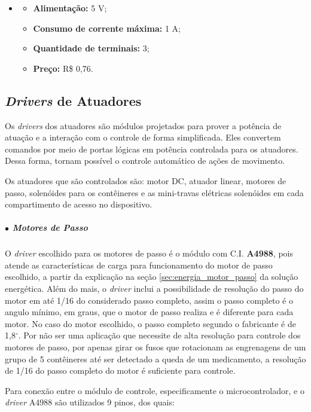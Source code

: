 	\begin{itemize}
		\item[ ]
		\begin{itemize}
			\item \textbf{Alimentação:} 5 V;
			\item \textbf{Consumo de corrente máxima:} 1 A;
			\item \textbf{Quantidade de terminais:} 3;
			\item \textbf{Preço:} R\$ 0,76.
		\end{itemize}
	\end{itemize}

\subsection{\textit{Drivers} de Atuadores}
    
    Os \textit{drivers} dos atuadores são módulos projetados para prover a potência de atuação e a interação com o controle de forma simplificada. Eles convertem comandos por meio de portas lógicas em potência controlada para os atuadores. Dessa forma, tornam possível o controle automático de ações de movimento.
    
    Os atuadores que são controlados são: motor DC, atuador linear, motores de passo, solenóides para os contêineres e as mini-travas elétricas solenóides em cada compartimento de acesso no dispositivo.
    
    \subparagraph*{$\bullet$ \textbf{Motores de Passo}}\label{sec:eletronica_drivers_passo}
    
    O \textit{driver} escolhido para os motores de passo é o módulo com C.I. \textbf{A4988}, pois atende as características de carga para funcionamento do motor de passo escolhido, a partir da explicação na seção \ref{sec:energia_motor_passo} da solução energética. Além do mais, o \textit{driver} inclui a possibilidade de resolução do passo do motor em até 1/16 do considerado passo completo, assim o passo completo é o angulo mínimo, em graus, que o motor de passo realiza e é diferente para cada motor. No caso do motor escolhido, o passo completo segundo o fabricante é de 1,8$^\circ$. Por não ser uma aplicação que necessite de alta resolução para controle dos motores de passo, por apenas girar os fusos que rotacionam as engrenagens de um grupo de 5 contêineres até ser detectado a queda de um medicamento, a resolução de 1/16 do passo completo do motor é suficiente para controle.
    
    Para conexão entre o módulo de controle, especificamente o microcontrolador, e o \textit{driver} A4988 são utilizados 9 pinos, dos quais:
    
